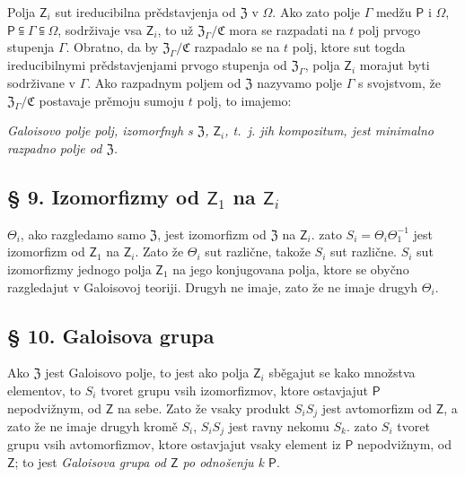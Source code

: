 \documentclass[11pt]{article}
\begin{document}
Polja \(\mathsf{Z}_i\) sut ireducibilna prědstavjenja od \(\mathfrak Z\) v \(\Omega\). Ako zato polje \(\Gamma\) medžu \(\mathsf P\) i \(\Omega\), \(\mathsf P\subseteqq\Gamma\subseteqq\Omega\), sodrživaje vsa \(\mathsf{Z}_i\), to už \(\mathfrak Z_\Gamma/\mathfrak C\) mora se razpadati na \(t\) polj prvogo stupenja \(\Gamma\). Obratno, da by \(\mathfrak Z_\Gamma/\mathfrak C\) razpadalo se na \(t\) polj, ktore sut togda ireducibilnymi prědstavjenjami prvogo stupenja od \(\mathfrak Z_\Gamma\), polja \(\mathsf{Z}_i\) morajut byti sodrživane v \(\Gamma\). Ako razpadnym poljem od \(\mathfrak Z\) nazyvamo polje \(\Gamma\) s svojstvom, že \(\mathfrak Z_\Gamma/\mathfrak C\) postavaje prěmoju sumoju \(t\) polj, to imajemo:

\emph{Galoisovo polje polj, izomorfnyh s \(\mathfrak Z\), \(\mathsf{Z}_i\), t.~j. jih kompozitum, jest minimalno razpadno polje od \(\mathfrak Z\).}

\subsection*{§ 9. Izomorfizmy od \(\mathsf{Z}_1\) na \(\mathsf{Z}_i\)}\label{die-isomorphismen-von-z1-auf-die-zi}

\(\Theta_i\), ako razgledamo samo \(\mathfrak Z\), jest izomorfizm od \(\mathfrak Z\) na \(\mathsf{Z}_i\). zato \(S_i=\Theta_i\Theta_1^{-1}\) jest izomorfizm od \(\mathsf{Z}_1\) na \(\mathsf{Z}_i\). Zato že \(\Theta_i\) sut različne, takože \(S_i\) sut različne. \(S_i\) sut izomorfizmy jednogo polja \(\mathsf{Z}_1\) na jego konjugovana polja, ktore se obyčno razgledajut v Galoisovoj teoriji. Drugyh ne imaje, zato že ne imaje drugyh \(\Theta_i\).

\subsection*{§ 10. Galoisova grupa}\label{die-galoissche-gruppe}

Ako \(\mathfrak Z\) jest Galoisovo polje, to jest ako polja \(\mathsf{Z}_i\) sběgajut se kako množstva elementov, to \(S_i\) tvoret grupu vsih izomorfizmov, ktore ostavjajut \(\mathsf P\) nepodvižnym, od \(\mathsf{Z}\) na sebe. Zato že vsaky produkt \(S_iS_j\) jest avtomorfizm od \(\mathsf{Z}\), a zato že ne imaje drugyh kromě \(S_i\), \(S_iS_j\) jest ravny nekomu \(S_k\). zato \(S_i\) tvoret grupu vsih avtomorfizmov, ktore ostavjajut vsaky element iz \(\mathsf P\) nepodvižnym, od \(\mathsf{Z}\); to jest \emph{Galoisova grupa od \(\mathsf{Z}\) po odnošenju k \(\mathsf P\)}.
\end{document}
